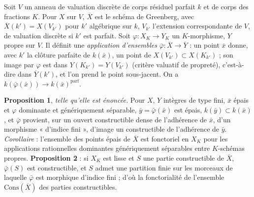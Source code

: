 \documentclass[11pt,a4paper]{article}
\begin{document}
Soit $V$ un anneau de valuation discrète de corps résiduel parfait $k$ et de
corps des fractions $K$. Pour $X$ sur $V$, $\overline{X}$ est le schéma de
Greenberg, avec $\overline{X}(k') = X(V_{k'})$ pour $k'$ algébrique sur $k$,
$V_{k'}$ l'extension correspondante de $V$, de valuation discrète si $k'$ est
parfait. Soit $\varphi : X_K \to Y_K$ un $K$-morphisme, $Y$ propre sur $V$. Il
définit une \emph{application d'ensembles} $\bar\varphi : \overline{X} \to
\overline{Y}$ : un point $\bar x$ donne, avec $k'$ la clôture parfaite de
$k(\bar x)$, un point de $X(V_{k'}) \subset X(K_{k'})$ ; son image par $\varphi$
est dans $Y(K_{k'}) = Y(V_{k'})$ (critère valuatif de propreté), c'est-à-dire
dans $\overline{Y}(k')$, et l'on prend le point sous-jacent. On a $k(\bar\varphi(\bar
x)) \to k(\bar x)^{\mathrm{parf}}$.

\textbf{Proposition 1}, \emph{telle qu'elle est énoncée.} Pour $X$, $Y$ intègres
de type fini, $\bar x$ épais et $\varphi$ dominante et génériquement séparable,
$\bar y = \bar\varphi(\bar x)$ est épais, $k(\bar y) \subset k(\bar x)$, et
$\bar\varphi$ provient, sur un ouvert constructible dense de l'adhérence de
$\bar x$, d'un morphisme « d'indice fini », d'image un constructible de
l'adhérence de $\bar y$. \emph{Corollaire} : l'ensemble des points épais de
$\overline{X}$ est fonctoriel en $X_K$ pour les applications rationnelles
dominantes génériquement séparables entre $K$-schémas propres.
\textbf{Proposition 2} : si $X_K$ est lisse et $S$ une partie constructible de
$\overline{X}$, $\bar\varphi(S)$ est constructible, et $S$ admet une partition
finie sur les morceaux de laquelle $\bar\varphi$ est morphique d'indice fini ;
d'où la fonctorialité de l'ensemble $\mathrm{Cons}(\overline{X})$ des parties
constructibles.
\end{document}
